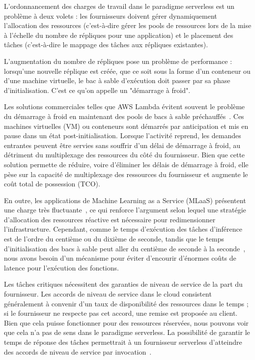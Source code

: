 L'ordonnancement des charges de travail dans le paradigme serverless est un problème à deux volets : les fournisseurs doivent gérer dynamiquement l'allocation des ressources (c'est-à-dire gérer les pools de ressources lors de la mise à l'échelle du nombre de répliques pour une application) et le placement des tâches (c'est-à-dire le mappage des tâches aux répliques existantes).

L'augmentation du nombre de répliques pose un problème de performance : lorsqu'une nouvelle réplique est créée, que ce soit sous la forme d'un conteneur ou d'une machine virtuelle, le bac à sable d'exécution doit passer par sa phase d'initialisation. C'est ce qu'on appelle un "démarrage à froid".

Les solutions commerciales telles que AWS Lambda évitent souvent le problème du démarrage à froid en maintenant des pools de bacs à sable préchauffés~\cite{vahidiniaColdStartServerless2020}. Ces machines virtuelles (VM) ou conteneurs sont démarrés par anticipation et mis en pause dans un état post-initialisation. Lorsque l'activité reprend, les demandes entrantes peuvent être servies sans souffrir d'un délai de démarrage à froid, au détriment du multiplexage des ressources du côté du fournisseur. Bien que cette solution permette de réduire, voire d'éliminer les délais de démarrage à froid, elle pèse sur la capacité de multiplexage des ressources du fournisseur et augmente le coût total de possession (TCO).

En outre, les applications de Machine Learning as a Service (MLaaS) présentent une charge très fluctuante~\cite{gujaratiSwayamDistributedAutoscaling2017}, ce qui renforce l'argument selon lequel une stratégie d'allocation des ressources réactive est nécessaire pour redimensionner l'infrastructure. Cependant, comme le temps d'exécution des tâches d'inférence est de l'ordre du centième ou du dixième de seconde, tandis que le temps d'initialisation des bacs à sable peut aller du centième de seconde à la seconde~\cite{mancoMyVMLighter2017}, nous avons besoin d'un mécanisme pour éviter d'encourir d'énormes coûts de latence pour l'exécution des fonctions.

Les tâches critiques nécessitent des garanties de niveau de service de la part du fournisseur. Les accords de niveau de service dans le cloud consistent généralement à convenir d'un taux de disponibilité des ressources dans le temps ; si le fournisseur ne respecte pas cet accord, une remise est proposée au client. Bien que cela puisse fonctionner pour des ressources réservées, nous pouvons voir que cela n'a pas de sens dans le paradigme serverless. La possibilité de garantir le temps de réponse des tâches permettrait à un fournisseur serverless d'atteindre des accords de niveau de service par invocation~\cite{zhangMArkExploitingCloud}.

